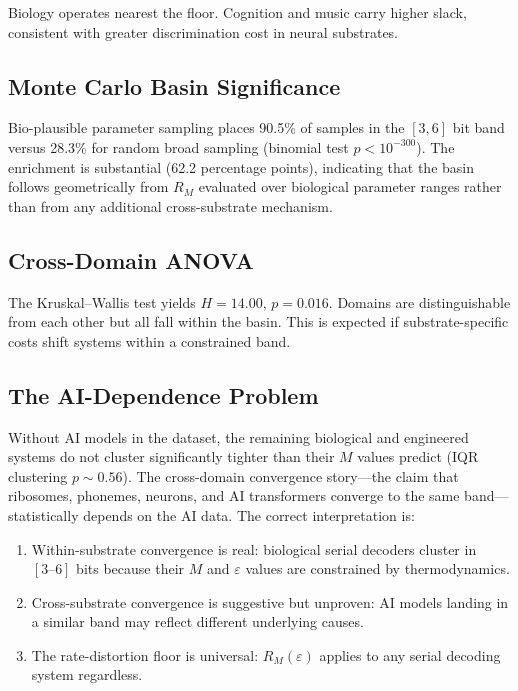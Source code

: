 \documentclass[11pt]{article}
\begin{document}
Biology operates nearest the floor. Cognition and music carry higher slack, consistent with greater discrimination cost in neural substrates.

\subsection{Monte Carlo Basin Significance}

Bio-plausible parameter sampling places 90.5\% of samples in the $[3, 6]$ bit band versus 28.3\% for random broad sampling (binomial test $p < 10^{-300}$). The enrichment is substantial (62.2 percentage points), indicating that the basin follows geometrically from $R_M$ evaluated over biological parameter ranges rather than from any additional cross-substrate mechanism.

\subsection{Cross-Domain ANOVA}

The Kruskal--Wallis test yields $H = 14.00$, $p = 0.016$. Domains are distinguishable from each other but all fall within the basin. This is expected if substrate-specific costs shift systems within a constrained band.

\subsection{The AI-Dependence Problem}

Without AI models in the dataset, the remaining biological and engineered systems do not cluster significantly tighter than their $M$ values predict (IQR clustering $p \sim 0.56$). The cross-domain convergence story---the claim that ribosomes, phonemes, neurons, and AI transformers converge to the same band---statistically depends on the AI data. The correct interpretation is:

\begin{enumerate}
    \item Within-substrate convergence is real: biological serial decoders cluster in $[3\text{--}6]$ bits because their $M$ and $\varepsilon$ values are constrained by thermodynamics.
    \item Cross-substrate convergence is suggestive but unproven: AI models landing in a similar band may reflect different underlying causes.
    \item The rate-distortion floor is universal: $R_M(\varepsilon)$ applies to any serial decoding system regardless.
\end{enumerate}
\end{document}
